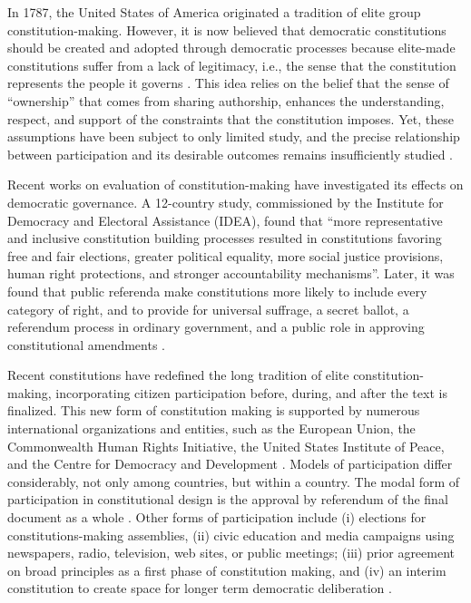 \documentclass[onecolumn]{article}
\begin{document}
In 1787, the United States of America originated a tradition of elite group constitution-making. However, it is now believed that democratic constitutions should be created and adopted through democratic processes because elite-made constitutions suffer from a lack of legitimacy,  i.e., the sense that the constitution represents the people it governs \cite{elster1993,ginsburg2009,usip}. This idea relies on the belief that the sense of ``ownership'' that comes from sharing authorship, enhances the understanding, respect, and support of the constraints that the constitution imposes. Yet, these assumptions have been subject to only limited study, and the precise relationship between participation and its desirable outcomes remains insufficiently studied \cite{ginsburg2009}.

Recent works on evaluation of constitution-making have investigated its effects on democratic governance. A 12-country study, commissioned by the Institute for Democracy and Electoral Assistance (IDEA), found that ``more representative and inclusive constitution building processes resulted in constitutions favoring free and fair elections, greater political equality, more social justice provisions, human right protections, and stronger accountability mechanisms''\cite{samuels2006}. Later, it was found that public referenda make constitutions more likely to include every category of right, and to provide for universal suffrage, a secret ballot, a referendum process in ordinary government, and a public role in approving constitutional amendments \cite{ginsburg2009}.


Recent constitutions have redefined the long tradition of elite constitution-making, incorporating citizen participation before, during, and after the text is finalized.  This new form of constitution making is supported by numerous international organizations and entities, such as the European Union, the Commonwealth Human Rights Initiative, the United States Institute of Peace, and the Centre for Democracy and Development \cite{banks2007}. Models of participation differ considerably, not only among countries, but within a country. The modal form of participation in constitutional design is the approval by referendum of the final document as a whole \cite{ginsburg2009}. Other forms of participation include (i) elections for constitutions-making assemblies, (ii) civic education and media campaigns using newspapers, radio, television, web sites, or public meetings; (iii) prior agreement on broad principles as a first phase of constitution making, and (iv) an interim constitution to create space for longer term democratic deliberation \cite{ginsburg2009,usip}.
\end{document}
